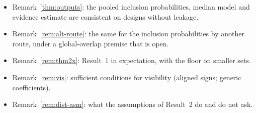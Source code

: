 \begin{itemize}[leftmargin=1.5em,itemsep=1pt]
  \item Remark~\ref{thm:outputs}: the pooled inclusion probabilities, median model and evidence estimate are consistent on
    designs without leakage.
  \item Remark~\ref{rem:alt-route}: the same for the inclusion probabilities by another route, under a global-overlap
    premise that is open.
  \item Remark~\ref{rem:thm2x}: Result~1 in expectation, with the floor on smaller sets.
  \item Remark~\ref{rem:vis}: sufficient conditions for visibility (aligned signs; generic coefficients).
  \item Remark~\ref{rem:dist-asm}: what the assumptions of Result~2 do and do not ask.
\end{itemize}
